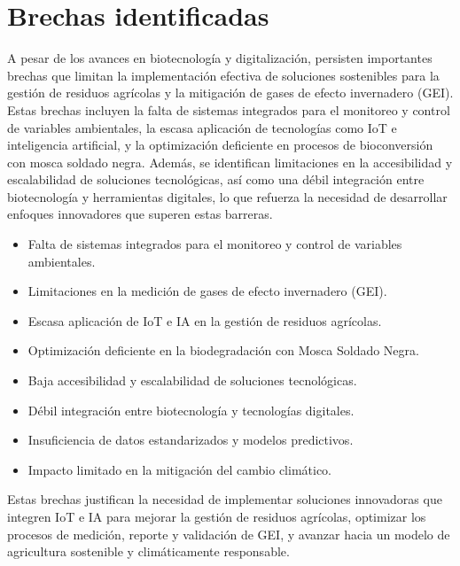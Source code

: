 \section{Brechas identificadas}
A pesar de los avances en biotecnología y digitalización, persisten importantes brechas que limitan la implementación efectiva de soluciones sostenibles para la gestión de residuos agrícolas y la mitigación de gases de efecto invernadero (GEI). Estas brechas incluyen la falta de sistemas integrados para el monitoreo y control de variables ambientales, la escasa aplicación de tecnologías como IoT e inteligencia artificial, y la optimización deficiente en procesos de bioconversión con mosca soldado negra. Además, se identifican limitaciones en la accesibilidad y escalabilidad de soluciones tecnológicas, así como una débil integración entre biotecnología y herramientas digitales, lo que refuerza la necesidad de desarrollar enfoques innovadores que superen estas barreras.

\begin{itemize}
    \item Falta de sistemas integrados para el monitoreo y control de variables ambientales.
    \item Limitaciones en la medición de gases de efecto invernadero (GEI).
    \item Escasa aplicación de IoT e IA en la gestión de residuos agrícolas.
    \item Optimización deficiente en la biodegradación con Mosca Soldado Negra.
    \item Baja accesibilidad y escalabilidad de soluciones tecnológicas.
    \item Débil integración entre biotecnología y tecnologías digitales.
    \item Insuficiencia de datos estandarizados y modelos predictivos.
    \item Impacto limitado en la mitigación del cambio climático.
\end{itemize}

Estas brechas justifican la necesidad de implementar soluciones innovadoras que integren IoT e IA para mejorar la gestión de residuos agrícolas, optimizar los procesos de medición, reporte y validación de GEI, y avanzar hacia un modelo de agricultura sostenible y climáticamente responsable.